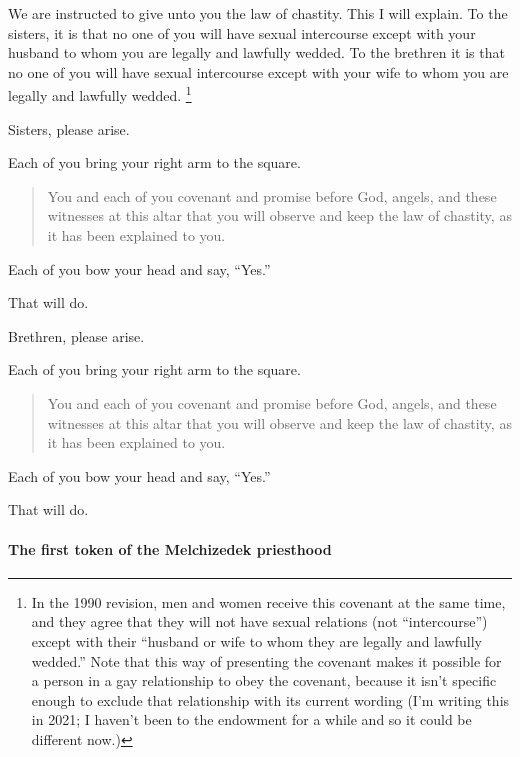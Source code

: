 				We are instructed to give unto you the law of chastity. This I will explain. To the sisters, it is that no one of you will have sexual intercourse except with your husband to whom you are legally and lawfully wedded. To the brethren it is that no one of you will have sexual intercourse except with your wife to whom you are legally and lawfully wedded.%
					\footnote{%
						\label{ENDOWMENT-lawfully}%
						In the 1990 revision, men and women receive this covenant at the same time, and they agree that they will not have sexual relations (not ``intercourse'') except with their ``husband or wife to whom they are legally and lawfully wedded.'' Note that this way of presenting the covenant makes it possible for a person in a gay relationship to obey the covenant, because it isn't specific enough to exclude that relationship with its current wording (I'm writing this in 2021; I haven't been to the endowment for a while and so it could be different now.)
						}

				Sisters, please arise.

				Each of you bring your right arm to the square.

				\begin{quote}
					You and each of you covenant and promise before God, angels, and these witnesses at this altar that you will observe and keep the law of chastity, as it has been explained to you.
				\end{quote}
				
				Each of you bow your head and say, ``Yes.''

				That will do.

				Brethren, please arise.

				Each of you bring your right arm to the square.

				\begin{quote}
					You and each of you covenant and promise before God, angels, and these witnesses at this altar that you will observe and keep the law of chastity, as it has been explained to you.
				\end{quote}
				
				Each of you bow your head and say, ``Yes.''

				That will do.
				
			\paragraph{The first token of the Melchizedek priesthood}
				\label{TEMPLE-ENDOWMENT-ENDOW-PRE-1990-FIRST-MELCHIZEDEK}
				
